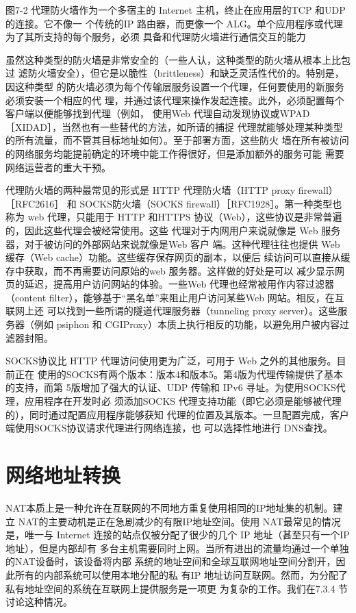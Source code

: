 图7-2 代理防火墙作为一个多宿主的 Internet 主机，终止在应用层的TCP 和UDP 的连接。它不像一
个传统的IP 路由器，而更像一个 ALG。单个应用程序或代理为了其所支持的每个服务，必须
具备和代理防火墙进行通信交互的能力

虽然这种类型的防火墙是非常安全的（一些人认，这种类型的防火墙从根本上比包过
滤防火墙安全），但它是以脆性（brittleness）和缺乏灵活性代价的。特别是，因这种类型
的防火墙必须为每个传输层服务设置一个代理，任何要使用的新服务必须安装一个相应的代
理，并通过该代理来操作发起连接。此外，必须配置每个客户端以便能够找到代理（例如，
使用Web 代理自动发现协议或WPAD［XIDAD］，当然也有一些替代的方法，如所请的捕捉
代理就能够处理某种类型的所有流量，而不管其目标地址如何）。至于部署方面，这些防火
墙在所有被访问的网络服务均能提前确定的环境中能工作得很好，但是添加额外的服务可能
需要网络运营者的重大干预。

代理防火墙的两种最常见的形式是 HTTP 代理防火墙（HTTP proxy firewall） ［RFC2616］
和 SOCKS防火墙（SOCKS firewall）［RFC1928］。第一种类型也称为 web 代理，只能用于
HTTP 和HTTPS 协议（Web），这些协议是非常普遍的，因此这些代理会被经常使用。这些
代理对于内网用户来说就像是 Web 服务器，对于被访问的外部网站来说就像是Web 客户
端。这种代理往往也提供 Web 缓存（Web cache）功能。这些缓存保存网页的副本，以便后
续访问可以直接从缓存中获取，而不再需要访问原始的web 服务器。这样做的好处是可以
减少显示网页的延迟，提高用户访问网站的体验。一些Web 代理也经常被用作内容过滤器
（content filter），能够基于“黑名单”来阻止用户访问某些Web 网站。相反，在互联网上还
可以找到一些所谓的隧道代理服务器（tunneling proxy server）。这些服务器（例如 psiphon 和
CGIProxy）本质上执行相反的功能，以避免用户被内容过滤器封阻。

SOCKS协议比 HTTP 代理访问使用更为广泛，可用于 Web 之外的其他服务。目前正在
使用的SOCKS有两个版本：版本4和版本5。第4版为代理传输提供了基本的支持，而第
5版增加了强大的认证、UDP 传输和 IPv6 寻址。为使用SOCKS代理，应用程序在开发时必
须添加SOCKS 代理支持功能（即它必须是能够被代理的），同时通过配置应用程序能够获知
代理的位置及其版本。一旦配置完成，客户端使用SOCKS协议请求代理进行网络连接，也
可以选择性地进行 DNS查找。

\section{网络地址转换}

NAT本质上是一种允许在互联网的不同地方重复使用相同的IP地址集的机制。建立
NAT的主要动机是正在急剧减少的有限IP地址空间。使用 NAT最常见的情况是，唯一与
Internet 连接的站点仅被分配了很少的几个 IP 地址（甚至只有一个IP地址），但是内部却有
多台主机需要同时上网。当所有进出的流量均通过一个单独的NAT设备时，该设备将内部
系统的地址空间和全球互联网地址空间分割开，因此所有的内部系统可以使用本地分配的私
有IP 地址访问互联网。然而，为分配了私有地址空间的系统在互联网上提供服务是一项更
为复杂的工作。我们在7.3.4 节讨论这种情况。

